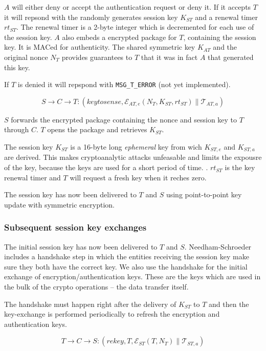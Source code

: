
$A$ will either deny or accept the authentication request or deny
it. If it accepts $T$ it will repsond with the randomly generates
session key $K_{ST}$ and a renewal timer $rt_{ST}$. The renewal timer
is a 2-byte integer which is decremented for each use of the session
key. $A$ also embeds a encrypted package for $T$, containing the
session key. It is MACed for authenticity. The shared symmetric key
$K_{AT}$ and the original nonce $N_T$ provides guarantees to $T$ that
it was in fact $A$ that generated this key.

If $T$ is denied it will repspond with \texttt{MSG\_T\_ERROR} (not yet
implemented).


\[
S \rightarrow C \rightarrow T: (keytosense,\mathcal{E}_{AT,e}(N_T,K_{ST},rt_{ST}) \parallel \mathcal{T}_{AT,a})
\]

$S$ forwards the encrypted package containing the nonce and session
key to $T$ through $C$. $T$ opens the package and retrieves
$K_{ST}$.

The session key $K_{ST}$ is a 16-byte long \textit{ephemeral} key from
wich $K_{ST,e}$ and $K_{ST,a}$ are derived. This makes cryptoanalytic
attacks unfeasable and limits the expousre of the key, because the
keys are used for a short period of time. \cite[pp. 494]{menzes1996}
. $rt_{ST}$ is the key renewal timer and $T$ will request a fresh key
when it reches zero.

The session key has now been delivered to $T$ and $S$ using
point-to-point key update with symmetric encryption.

\subsubsection{Subsequent session key exchanges}

The initial session key has now been delivered to $T$ and
$S$. Needham-Schroeder includes a handshake step in which the entities
receiving the session key make sure they both have the correct key. We
also use the handshake for the initial exchange of
encryption/authentication keys. These are the keys which are used in
the bulk of the crypto operations -- the data transfer itself.

The handshake must happen right after the delivery of $K_{ST}$ to $T$
and then the key-exchange is performed periodically to refresh the
encryption and authentication keys.

\[
T \rightarrow C \rightarrow S: (rekey,T,\mathcal{E}_{ST}(T,N_T) \parallel \mathcal{T}_{ST,a})
\]

